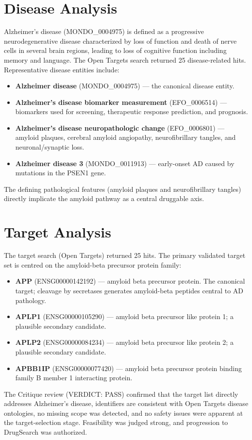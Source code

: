 \documentclass{article}
\begin{document}
\section{Disease Analysis}
Alzheimer's disease (MONDO\_0004975) is defined as a progressive neurodegenerative disease characterized by loss of function and death of nerve cells in several brain regions, leading to loss of cognitive function including memory and language. The Open Targets search returned 25 disease-related hits. Representative disease entities include:
\begin{itemize}
    \item \textbf{Alzheimer disease} (MONDO\_0004975) --- the canonical disease entity.
    \item \textbf{Alzheimer's disease biomarker measurement} (EFO\_0006514) --- biomarkers used for screening, therapeutic response prediction, and prognosis.
    \item \textbf{Alzheimer's disease neuropathologic change} (EFO\_0006801) --- amyloid plaques, cerebral amyloid angiopathy, neurofibrillary tangles, and neuronal/synaptic loss.
    \item \textbf{Alzheimer disease 3} (MONDO\_0011913) --- early-onset AD caused by mutations in the PSEN1 gene.
\end{itemize}
The defining pathological features (amyloid plaques and neurofibrillary tangles) directly implicate the amyloid pathway as a central druggable axis.

\section{Target Analysis}
The target search (Open Targets) returned 25 hits. The primary validated target set is centred on the amyloid-beta precursor protein family:
\begin{itemize}
    \item \textbf{APP} (ENSG00000142192) --- amyloid beta precursor protein. The canonical target; cleavage by secretases generates amyloid-beta peptides central to AD pathology.
    \item \textbf{APLP1} (ENSG00000105290) --- amyloid beta precursor like protein 1; a plausible secondary candidate.
    \item \textbf{APLP2} (ENSG00000084234) --- amyloid beta precursor like protein 2; a plausible secondary candidate.
    \item \textbf{APBB1IP} (ENSG00000077420) --- amyloid beta precursor protein binding family B member 1 interacting protein.
\end{itemize}
The Critique review (VERDICT: PASS) confirmed that the target list directly addresses Alzheimer's disease, identifiers are consistent with Open Targets disease ontologies, no missing scope was detected, and no safety issues were apparent at the target-selection stage. Feasibility was judged strong, and progression to DrugSearch was authorized.
\end{document}
